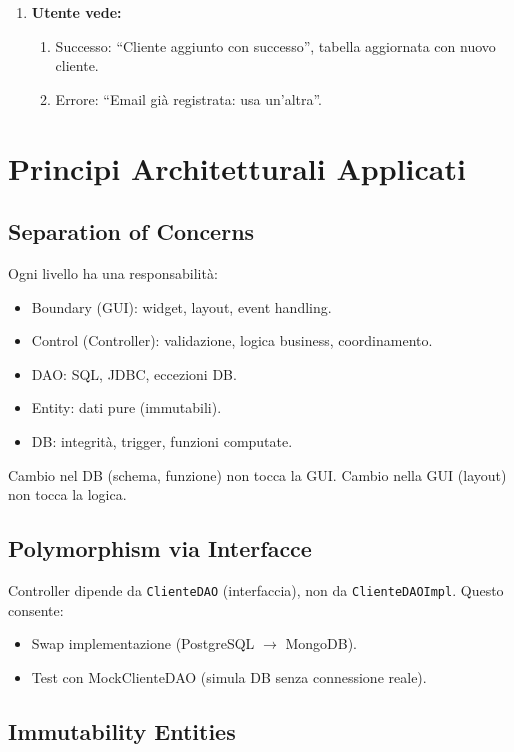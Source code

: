 \documentclass[12pt,a4paper]{article}
\begin{document}
\begin{enumerate}
\begin{enumerate}
  \item \textbf{Utente vede:}
  \begin{enumerate}
    \item Successo: ``Cliente aggiunto con successo'', tabella aggiornata con nuovo cliente.
    \item Errore: ``Email già registrata: usa un'altra''.
  \end{enumerate}
\end{enumerate}

\section{Principi Architetturali Applicati}

\subsection{Separation of Concerns}

Ogni livello ha una responsabilità:
\begin{itemize}
  \item Boundary (GUI): widget, layout, event handling.
  \item Control (Controller): validazione, logica business, coordinamento.
  \item DAO: SQL, JDBC, eccezioni DB.
  \item Entity: dati pure (immutabili).
  \item DB: integrità, trigger, funzioni computate.
\end{itemize}

Cambio nel DB (schema, funzione) non tocca la GUI.
Cambio nella GUI (layout) non tocca la logica.

\subsection{Polymorphism via Interfacce}

Controller dipende da \texttt{ClienteDAO} (interfaccia), non da \texttt{ClienteDAOImpl}.
Questo consente:
\begin{itemize}
  \item Swap implementazione (PostgreSQL $\to$ MongoDB).
  \item Test con MockClienteDAO (simula DB senza connessione reale).
\end{itemize}

\subsection{Immutability Entities}


\end{enumerate}
\end{document}
